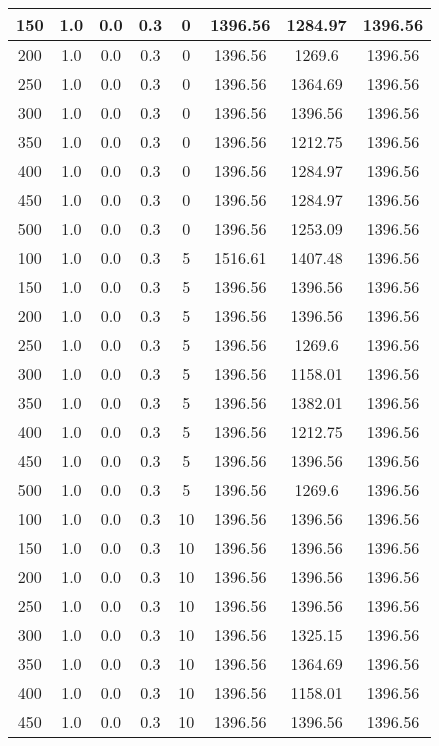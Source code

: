 \documentclass[a4paper, 12pt]{extreport}
\begin{document}
\begin{itemize}
\begin{longtable}{|c|c|c|c|c|c|c|c|}
			150 & 1.0 & 0.0 & 0.3 & 0 & 1396.56 & 1284.97 & 1396.56 \\\hline
			200 & 1.0 & 0.0 & 0.3 & 0 & 1396.56 & 1269.6 & 1396.56 \\\hline
			250 & 1.0 & 0.0 & 0.3 & 0 & 1396.56 & 1364.69 & 1396.56 \\\hline
			300 & 1.0 & 0.0 & 0.3 & 0 & 1396.56 & 1396.56 & 1396.56 \\\hline
			350 & 1.0 & 0.0 & 0.3 & 0 & 1396.56 & 1212.75 & 1396.56 \\\hline
			400 & 1.0 & 0.0 & 0.3 & 0 & 1396.56 & 1284.97 & 1396.56 \\\hline
			450 & 1.0 & 0.0 & 0.3 & 0 & 1396.56 & 1284.97 & 1396.56 \\\hline
			500 & 1.0 & 0.0 & 0.3 & 0 & 1396.56 & 1253.09 & 1396.56 \\\hline
			100 & 1.0 & 0.0 & 0.3 & 5 & 1516.61 & 1407.48 & 1396.56 \\\hline
			150 & 1.0 & 0.0 & 0.3 & 5 & 1396.56 & 1396.56 & 1396.56 \\\hline
			200 & 1.0 & 0.0 & 0.3 & 5 & 1396.56 & 1396.56 & 1396.56 \\\hline
			250 & 1.0 & 0.0 & 0.3 & 5 & 1396.56 & 1269.6 & 1396.56 \\\hline
			300 & 1.0 & 0.0 & 0.3 & 5 & 1396.56 & 1158.01 & 1396.56 \\\hline
			350 & 1.0 & 0.0 & 0.3 & 5 & 1396.56 & 1382.01 & 1396.56 \\\hline
			400 & 1.0 & 0.0 & 0.3 & 5 & 1396.56 & 1212.75 & 1396.56 \\\hline
			450 & 1.0 & 0.0 & 0.3 & 5 & 1396.56 & 1396.56 & 1396.56 \\\hline
			500 & 1.0 & 0.0 & 0.3 & 5 & 1396.56 & 1269.6 & 1396.56 \\\hline
			100 & 1.0 & 0.0 & 0.3 & 10 & 1396.56 & 1396.56 & 1396.56 \\\hline
			150 & 1.0 & 0.0 & 0.3 & 10 & 1396.56 & 1396.56 & 1396.56 \\\hline
			200 & 1.0 & 0.0 & 0.3 & 10 & 1396.56 & 1396.56 & 1396.56 \\\hline
			250 & 1.0 & 0.0 & 0.3 & 10 & 1396.56 & 1396.56 & 1396.56 \\\hline
			300 & 1.0 & 0.0 & 0.3 & 10 & 1396.56 & 1325.15 & 1396.56 \\\hline
			350 & 1.0 & 0.0 & 0.3 & 10 & 1396.56 & 1364.69 & 1396.56 \\\hline
			400 & 1.0 & 0.0 & 0.3 & 10 & 1396.56 & 1158.01 & 1396.56 \\\hline
			450 & 1.0 & 0.0 & 0.3 & 10 & 1396.56 & 1396.56 & 1396.56 \\\hline

\end{longtable}
\end{itemize}
\end{document}
